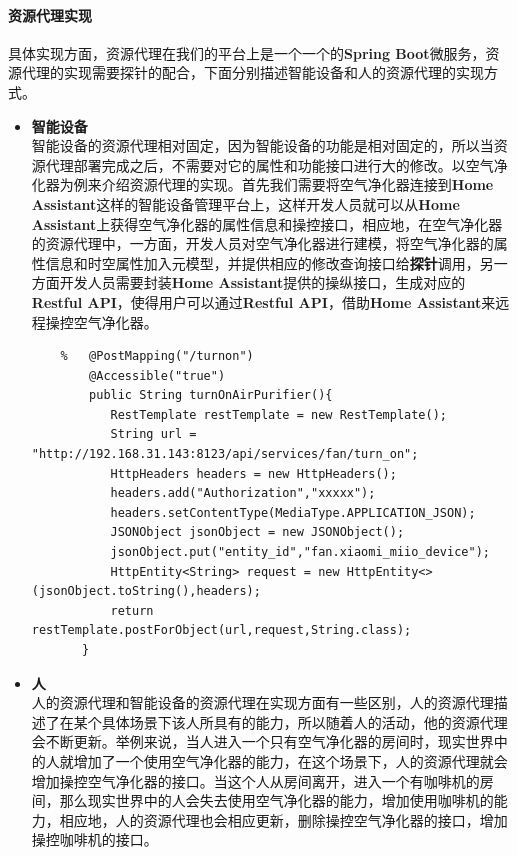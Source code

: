 \documentclass[12pt,a4paper]{article}
\begin{document}
\paragraph{资源代理实现}
具体实现方面，资源代理在我们的平台上是一个一个的\textbf{Spring Boot}微服务，资源代理的实现需要探针的配合，下面分别描述智能设备和人的资源代理的实现方式。
\begin{itemize}
 \item{\textbf{智能设备}}\\
 智能设备的资源代理相对固定，因为智能设备的功能是相对固定的，所以当资源代理部署完成之后，不需要对它的属性和功能接口进行大的修改。以空气净化器为例来介绍资源代理的实现。首先我们需要将空气净化器连接到\textbf{Home Assistant}这样的智能设备管理平台上，这样开发人员就可以从\textbf{Home Assistant}上获得空气净化器的属性信息和操控接口，相应地，在空气净化器的资源代理中，一方面，开发人员对空气净化器进行建模，将空气净化器的属性信息和时空属性加入元模型，并提供相应的修改查询接口给\textbf{探针}调用，另一方面开发人员需要封装\textbf{Home Assistant}提供的操纵接口，生成对应的\textbf{Restful API}，使得用户可以通过\textbf{Restful API}，借助\textbf{Home Assistant}来远程操控空气净化器。
 \begin{lstlisting}
    %   @PostMapping("/turnon")
        @Accessible("true")
        public String turnOnAirPurifier(){
           RestTemplate restTemplate = new RestTemplate();
           String url = "http://192.168.31.143:8123/api/services/fan/turn_on";
           HttpHeaders headers = new HttpHeaders();
           headers.add("Authorization","xxxxx");
           headers.setContentType(MediaType.APPLICATION_JSON);
           JSONObject jsonObject = new JSONObject();
           jsonObject.put("entity_id","fan.xiaomi_miio_device");
           HttpEntity<String> request = new HttpEntity<>(jsonObject.toString(),headers);
           return restTemplate.postForObject(url,request,String.class);
       }
    \end{lstlisting}
    \item{\textbf{人}}\\
    人的资源代理和智能设备的资源代理在实现方面有一些区别，人的资源代理描述了在某个具体场景下该人所具有的能力，所以随着人的活动，他的资源代理会不断更新。举例来说，当人进入一个只有空气净化器的房间时，现实世界中的人就增加了一个使用空气净化器的能力，在这个场景下，人的资源代理就会增加操控空气净化器的接口。当这个人从房间离开，进入一个有咖啡机的房间，那么现实世界中的人会失去使用空气净化器的能力，增加使用咖啡机的能力，相应地，人的资源代理也会相应更新，删除操控空气净化器的接口，增加操控咖啡机的接口。
\end{itemize}
\end{document}
